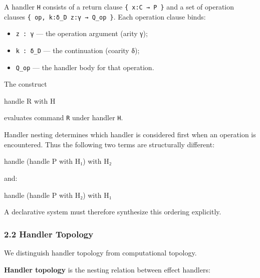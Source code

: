 \documentclass[
  11pt,
]{article}
\newenvironment{Shaded}{}{}
\newcommand{\NormalTok}[1]{#1}
\providecommand{\tightlist}{%
  \setlength{\itemsep}{0pt}\setlength{\parskip}{0pt}}
\begin{document}
A handler \texttt{H} consists of a return clause
\texttt{\{\ x:C\ →\ P\ \}} and a set of operation clauses
\texttt{\{\ op,\ k:δ\_D\ z:γ\ →\ Q\_op\ \}}. Each operation clause
binds:

\begin{itemize}
\tightlist
\item
  \texttt{z\ :\ γ} --- the operation argument (arity γ);
\item
  \texttt{k\ :\ δ\_D} --- the continuation (coarity δ);
\item
  \texttt{Q\_op} --- the handler body for that operation.
\end{itemize}

The construct

\begin{Shaded}
\begin{Highlighting}[]
\NormalTok{handle R with H}
\end{Highlighting}
\end{Shaded}

evaluates command \texttt{R} under handler \texttt{H}.

Handler nesting determines which handler is considered first when an
operation is encountered. Thus the following two terms are structurally
different:

\begin{Shaded}
\begin{Highlighting}[]
\NormalTok{handle (handle P with H₁) with H₂}
\end{Highlighting}
\end{Shaded}

and:

\begin{Shaded}
\begin{Highlighting}[]
\NormalTok{handle (handle P with H₂) with H₁}
\end{Highlighting}
\end{Shaded}

A declarative system must therefore synthesize this ordering explicitly.

\subsubsection{2.2 Handler Topology}\label{handler-topology}

We distinguish handler topology from computational topology.

\textbf{Handler topology} is the nesting relation between effect
handlers:
\end{document}
